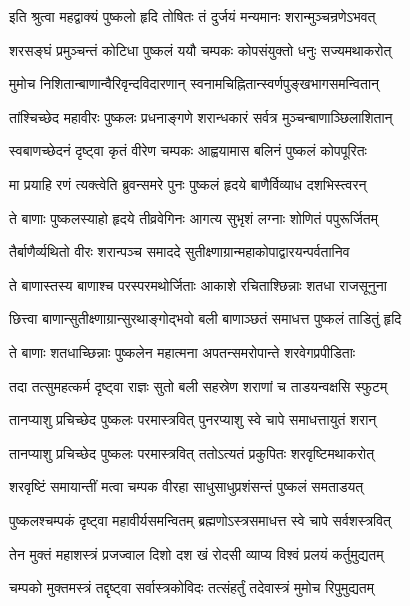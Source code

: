 
\twolineshloka
{इति श्रुत्वा महद्वाक्यं पुष्कलो हृदि तोषितः}
{तं दुर्जयं मन्यमानः शरान्मुञ्चन्रणेऽभवत्}%

\twolineshloka
{शरसङ्घं प्रमुञ्चन्तं कोटिधा पुष्कलं ययौ}
{चम्पकः कोपसंयुक्तो धनुः सज्यमथाकरोत्}%

\twolineshloka
{मुमोच निशितान्बाणान्वैरिवृन्दविदारणान्}
{स्वनामचिह्नितान्स्वर्णपुङ्खभागसमन्वितान्}%

\twolineshloka
{तांश्चिच्छेद महावीरः पुष्कलः प्रधनाङ्गणे}
{शरान्धकारं सर्वत्र मुञ्चन्बाणाञ्छिलाशितान्}%

\twolineshloka
{स्वबाणच्छेदनं दृष्ट्वा कृतं वीरेण चम्पकः}
{आह्वयामास बलिनं पुष्कलं कोपपूरितः}%

\twolineshloka
{मा प्रयाहि रणं त्यक्त्वेति ब्रुवन्समरे पुनः}
{पुष्कलं हृदये बाणैर्विव्याध दशभिस्त्वरन्}%

\twolineshloka
{ते बाणाः पुष्कलस्याहो हृदये तीव्रवेगिनः}
{आगत्य सुभृशं लग्नाः शोणितं पपुरूर्जितम्}%

\twolineshloka
{तैर्बाणैर्व्यथितो वीरः शरान्पञ्च समाददे}
{सुतीक्ष्णाग्रान्महाकोपाद्वारयन्पर्वतानिव}%

\twolineshloka
{ते बाणास्तस्य बाणाश्च परस्परमथोर्जिताः}
{आकाशे रचिताश्छिन्नाः शतधा राजसूनुना}%

\twolineshloka
{छित्त्वा बाणान्सुतीक्ष्णाग्रान्सुरथाङ्गोद्भवो बली}
{बाणाञ्छतं समाधत्त पुष्कलं ताडितुं हृदि}%

\twolineshloka
{ते बाणाः शतधाच्छिन्नाः पुष्कलेन महात्मना}
{अपतन्समरोपान्ते शरवेगप्रपीडिताः}%

\twolineshloka
{तदा तत्सुमहत्कर्म दृष्ट्वा राज्ञः सुतो बली}
{सहस्रेण शराणां च ताडयन्वक्षसि स्फुटम्}%

\twolineshloka
{तानप्याशु प्रचिच्छेद पुष्कलः परमास्त्रवित्}
{पुनरप्याशु स्वे चापे समाधत्तायुतं शरान्}%

\twolineshloka
{तानप्याशु प्रचिच्छेद पुष्कलः परमास्त्रवित्}
{ततोऽत्यतं प्रकुपितः शरवृष्टिमथाकरोत्}%

\twolineshloka
{शरवृष्टिं समायान्तीं मत्वा चम्पक वीरहा}
{साधुसाधुप्रशंसन्तं पुष्कलं समताडयत्}%

\twolineshloka
{पुष्कलश्चम्पकं दृष्ट्वा महावीर्यसमन्वितम्}
{ब्रह्मणोऽस्त्रसमाधत्त स्वे चापे सर्वशस्त्रवित्}%

\twolineshloka
{तेन मुक्तं महाशस्त्रं प्रजज्वाल दिशो दश}
{खं रोदसी व्याप्य विश्वं प्रलयं कर्तुमुद्यतम्}%

\twolineshloka
{चम्पको मुक्तमस्त्रं तद्दृष्ट्वा सर्वास्त्रकोविदः}
{तत्संहर्तुं तदेवास्त्रं मुमोच रिपुमुद्यतम्}%

